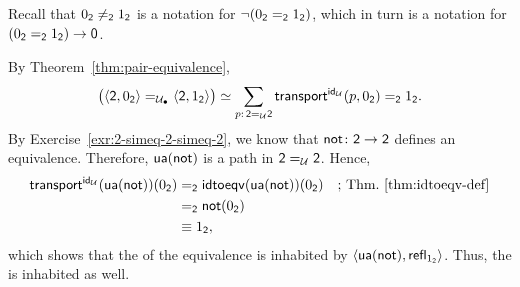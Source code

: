 \begin{solution}
    Recall that $0_{\mathsf{2}}\ne_{\mathsf{2}}1_{\mathsf{2}}$ is a notation for $\neg(0_{\mathsf{2}}\mathrel{=_{\mathsf{2}}}1_{\mathsf{2}})$, which in turn is a notation for $(0_{\mathsf{2}}\mathrel{=_{\mathsf{2}}}1_{\mathsf{2}})\to\mathsf{0}$.

    By Theorem~\ref{thm:pair-equivalence},
    \begin{align*}
        \bigl(
            \dep{\fun2,0_{\fun2}}
            \eq\puniv
            \dep{\fun2,1_{\fun2}}
        \bigr)
            \simeq\sum_{p\colon\fun2\eq\univ\fun2}
                \fun{transport}^{\id_\univ}(p,0_{\fun2})\eq{\fun2}1_{\fun2}.
    \end{align*}
    By Exercise~\ref{exr:2-simeq-2-simeq-2}, we know that $\fun{not}\colon\fun2\to\fun2$ defines an equivalence. Therefore, $\mathsf{ua}(\mathsf{not})$ is a path in $\mathsf{2}\mathrel{=_{\mathcal U}}\mathsf{2}$. Hence,
    \begin{align*}
        \mathsf{transport}^{\mathsf{id}_\mathcal U}(\mathsf{ua}(\mathsf{not}))(0_{\mathsf{2}})
            &\mathrel{=_{\mathsf{2}}}\mathsf{idtoeqv}(\mathsf{ua}(\mathsf{not}))(0_{\mathsf{2}})
                &&\text{; Thm.~\ref{thm:idtoeqv-def}}\\
            &\mathrel{=_{\mathsf{2}}}\mathsf{not}(0_{\mathsf{2}})\\
            &\equiv1_{\mathsf{2}},
    \end{align*}
    which shows that the \rhs of the equivalence is inhabited by $\langle\mathsf{ua}(\mathsf{not}),\mathsf{refl}_{1_{\mathsf{2}}}\rangle$. Thus, the \lhs is inhabited as well.
    
\end{solution}
